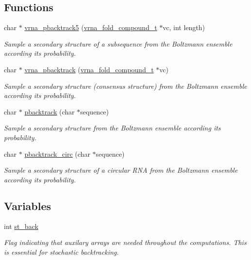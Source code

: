 \subsection*{Functions}
\begin{DoxyCompactItemize}
\item 
char $\ast$ \mbox{\hyperlink{group__subopt__stochbt_ga347375a4da8bdff74639529847f97d4f}{vrna\+\_\+pbacktrack5}} (\mbox{\hyperlink{group__fold__compound_ga1b0cef17fd40466cef5968eaeeff6166}{vrna\+\_\+fold\+\_\+compound\+\_\+t}} $\ast$vc, int length)
\begin{DoxyCompactList}\small\item\em Sample a secondary structure of a subsequence from the Boltzmann ensemble according its probability. \end{DoxyCompactList}\item 
char $\ast$ \mbox{\hyperlink{group__subopt__stochbt_ga901fe42a33b07be083421741bf7dc610}{vrna\+\_\+pbacktrack}} (\mbox{\hyperlink{group__fold__compound_ga1b0cef17fd40466cef5968eaeeff6166}{vrna\+\_\+fold\+\_\+compound\+\_\+t}} $\ast$vc)
\begin{DoxyCompactList}\small\item\em Sample a secondary structure (consensus structure) from the Boltzmann ensemble according its probability. \end{DoxyCompactList}\item 
char $\ast$ \mbox{\hyperlink{group__subopt__stochbt_gac03ca6db186bb3bf0a2a326d7fb3ba03}{pbacktrack}} (char $\ast$sequence)
\begin{DoxyCompactList}\small\item\em Sample a secondary structure from the Boltzmann ensemble according its probability. \end{DoxyCompactList}\item 
char $\ast$ \mbox{\hyperlink{group__subopt__stochbt_ga00474051204ac9ad576b3e45174d03ff}{pbacktrack\+\_\+circ}} (char $\ast$sequence)
\begin{DoxyCompactList}\small\item\em Sample a secondary structure of a circular R\+NA from the Boltzmann ensemble according its probability. \end{DoxyCompactList}\end{DoxyCompactItemize}
\subsection*{Variables}
\begin{DoxyCompactItemize}
\item 
int \mbox{\hyperlink{group__subopt__stochbt_gacd79b1a570e6ad9be24cb11fe8cae30a}{st\+\_\+back}}
\begin{DoxyCompactList}\small\item\em Flag indicating that auxilary arrays are needed throughout the computations. This is essential for stochastic backtracking. \end{DoxyCompactList}\end{DoxyCompactItemize}


